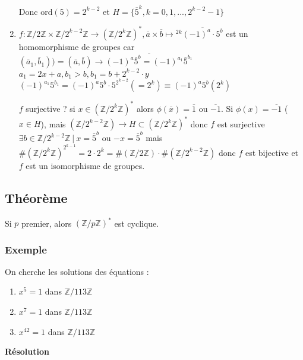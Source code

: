 \documentclass[a4paper,10pt]{book} %
\newcommand{\Z}{\mathbb{Z}}
\newcommand{\tq}{~|~}
\newcommand{\ord}{\mathrm{ord}}
\begin{document}
\begin{enumerate}
Donc $\ord(5)=2^{k-2}$ et $H=\{ \overline{5}^k, k=0,1,...,2^{k-2}-1\}$\\

\item $f:\Z/2\Z \times \Z/2^{k-2}\Z \rightarrow (\Z/2^k\Z)^* , \overline{a} \times \overline{b} \mapsto {}^{2k}\overline{(-1)^a\cdot 5^b}$ est un homomorphisme de groupes
car $(\overline{a}_1,\overline{b}_1))=(\overline{a},\overline{b}) \rightarrow \overline{(-1)^a\overline{5}^b = (-1)^{a_1}\overline{5}^{b_1}}$\\

$a_1 = 2x+a, b_1>b, b_1=b+2^{k-2}\cdot y$\\
$(-1)^{a_1}5^{b_1} =(-1)^a 5^b\cdot 5^{2^{k-2}}(=2^k) \equiv (-1)^a 5^b (2^k)$

$f$ surjective ?
si $x\in (\Z/2^k\Z)^*$ alors $\phi(\overline{x})=\overline{1}$ ou $\overline{-1}$.
Si $\phi(x)=\overline{-1}$ ($x\in H$), mais $(\Z/2^{k-2}\Z) \rightarrow H\subset(\Z/2^k\Z)^*$
donc $f$ est surjective
$\exists b\in \Z/2^{k-2}\Z \tq x=\overline{5}^b$ ou $-x=\overline{5}^b$
mais $\#(\Z/2^k\Z)^{2^{k-1}}=2\cdot 2^k=\#(\Z/2\Z)\cdot \#(\Z/2^{k-2}\Z)$ donc $f$ est bijective
et $f$ est un isomorphisme de groupes.


\end{enumerate}

\newpage

\subsection{Théorème}
Si $p$ premier, alors $(\Z/p\Z)^*$ est cyclique.

\subsubsection{Exemple}
On cherche les solutions des équations :
\begin{enumerate}
\item $x^5=1$ dans $\Z/113\Z$
\item $x^7=1$ dans $\Z/113\Z$
\item $x^{42}=1$ dans $\Z/113\Z$
\end{enumerate}

\bigskip

\textbf{Résolution}\\
\end{document}
